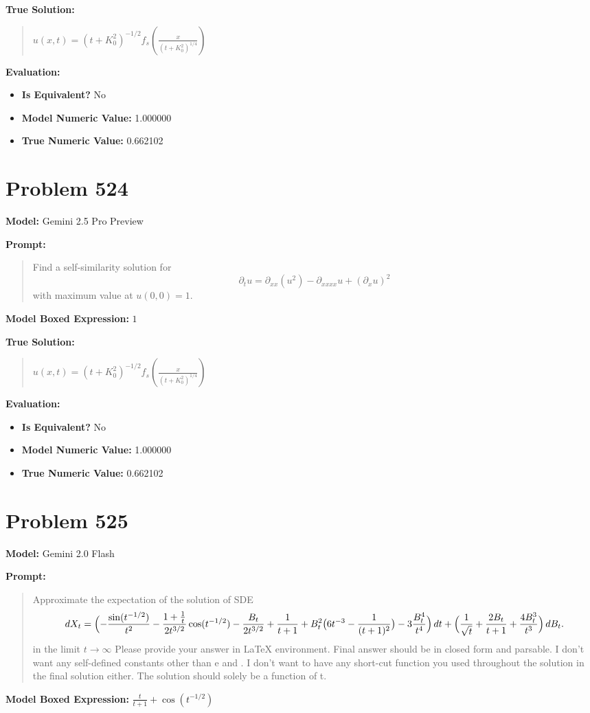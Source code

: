 \documentclass{article}
\begin{document}
\textbf{True Solution:}
\begin{quote}
$u(x,t) = (t+K_0^2)^{-1/2} f_s\left( \frac{x}{(t+K_0^2)^{1/4}} \right)$
\end{quote}

\textbf{Evaluation:}
\begin{itemize}
\item \textbf{Is Equivalent?} No
\item \textbf{Model Numeric Value:} 1.000000
\item \textbf{True Numeric Value:} 0.662102
\end{itemize}
\vspace{1cm}
\section*{Problem 524}
\textbf{Model:} Gemini 2.5 Pro Preview

\textbf{Prompt:}
\begin{quote}
Find a self-similarity solution for $$ \partial_t u = \partial_{xx}(u^2) - \partial_{xxxx}u + (\partial_x u)^2 $$ with maximum value at $u(0,0) = 1$.
\end{quote}
\textbf{Model Boxed Expression:} $1$

\textbf{True Solution:}
\begin{quote}
$u(x,t) = (t+K_0^2)^{-1/2} f_s\left( \frac{x}{(t+K_0^2)^{1/4}} \right)$
\end{quote}

\textbf{Evaluation:}
\begin{itemize}
\item \textbf{Is Equivalent?} No
\item \textbf{Model Numeric Value:} 1.000000
\item \textbf{True Numeric Value:} 0.662102
\end{itemize}
\vspace{1cm}
\section*{Problem 525}
\textbf{Model:} Gemini 2.0 Flash

\textbf{Prompt:}
\begin{quote}
Approximate the expectation of the solution of SDE $$dX_t = \Bigl(-\frac{\sin(t^{-1/2})}{t^2}-\frac{1+\tfrac1t}{2t^{3/2}}\cos(t^{-1/2})-\frac{B_t}{2t^{3/2}}+\frac1{t+1}+B_t^2\bigl(6t^{-3}-\frac1{(t+1)^2}\bigr)-3\frac{B_t^4}{t^4}\Bigr)\,dt + \Bigl(\frac1{\sqrt t}+\frac{2B_t}{t+1}+\frac{4B_t^3}{t^3}\Bigr)\,dB_t.$$ in the limit $t \to \infty$ Please provide your answer in LaTeX \boxed{} environment. Final answer should be in closed form and parsable. I don't want any self-defined constants other than e and \pi. I don't want to have any short-cut function you used throughout the solution in the final solution either. The solution should solely be a function of t.
\end{quote}
\textbf{Model Boxed Expression:} $\frac{t}{t+1}+\cos(t^{-1/2})$
\end{document}

